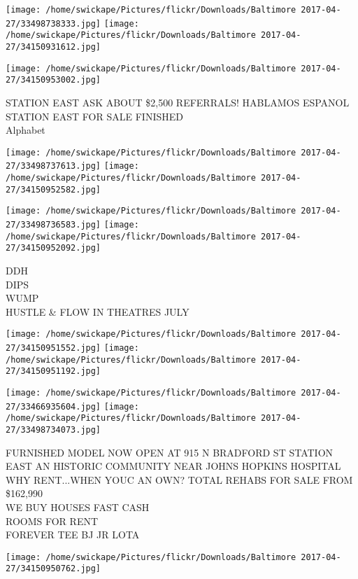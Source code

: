 \documentclass[10pt,letterpaper]{article}
\begin{document}
\texttt{[image: /home/swickape/Pictures/flickr/Downloads/Baltimore 2017-04-27/33498738333.jpg]}
\texttt{[image: /home/swickape/Pictures/flickr/Downloads/Baltimore 2017-04-27/34150931612.jpg]}

\vspace{0.25in}
\texttt{[image: /home/swickape/Pictures/flickr/Downloads/Baltimore 2017-04-27/34150953002.jpg]}

STATION EAST ASK ABOUT \$2,500 REFERRALS!  HABLAMOS ESPANOL\\
STATION EAST FOR SALE FINISHED\\
Alphabet\\
\pagebreak

\texttt{[image: /home/swickape/Pictures/flickr/Downloads/Baltimore 2017-04-27/33498737613.jpg]}
\texttt{[image: /home/swickape/Pictures/flickr/Downloads/Baltimore 2017-04-27/34150952582.jpg]}

\texttt{[image: /home/swickape/Pictures/flickr/Downloads/Baltimore 2017-04-27/33498736583.jpg]}
\texttt{[image: /home/swickape/Pictures/flickr/Downloads/Baltimore 2017-04-27/34150952092.jpg]}

DDH\\
DIPS\\
WUMP\\
HUSTLE \& FLOW IN THEATRES JULY\\
\pagebreak

\texttt{[image: /home/swickape/Pictures/flickr/Downloads/Baltimore 2017-04-27/34150951552.jpg]}
\texttt{[image: /home/swickape/Pictures/flickr/Downloads/Baltimore 2017-04-27/34150951192.jpg]}

\texttt{[image: /home/swickape/Pictures/flickr/Downloads/Baltimore 2017-04-27/33466935604.jpg]}
\texttt{[image: /home/swickape/Pictures/flickr/Downloads/Baltimore 2017-04-27/33498734073.jpg]}

FURNISHED MODEL NOW OPEN AT 915 N BRADFORD ST STATION EAST AN HISTORIC COMMUNITY NEAR JOHNS HOPKINS HOSPITAL WHY RENT...WHEN YOUC AN OWN?  TOTAL REHABS FOR SALE FROM \$162,990\\
WE BUY HOUSES FAST CASH\\
ROOMS FOR RENT\\
FOREVER TEE BJ JR LOTA\\
\pagebreak

\texttt{[image: /home/swickape/Pictures/flickr/Downloads/Baltimore 2017-04-27/34150950762.jpg]}
\end{document}
